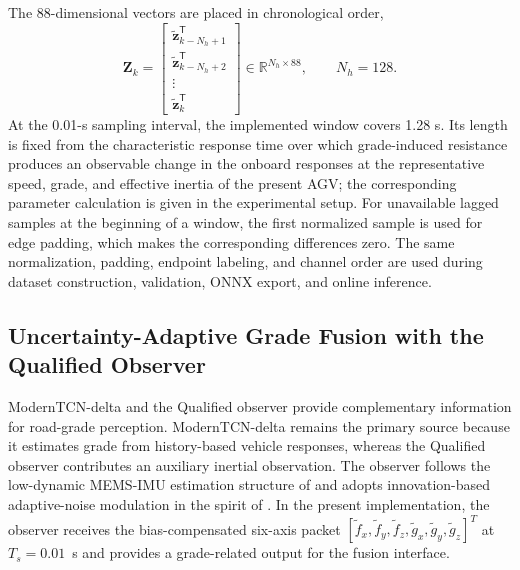 \documentclass{ieeeaccess}
\newcommand{\citep}[1]{\cite{#1}}
\begin{document}
The 88-dimensional vectors are placed in chronological order,
\begin{equation}
\mathbf Z_k=
\begin{bmatrix}
\widetilde{\mathbf z}_{k-N_h+1}^{\mathsf T}\\
\widetilde{\mathbf z}_{k-N_h+2}^{\mathsf T}\\
\vdots\\
\widetilde{\mathbf z}_{k}^{\mathsf T}
\end{bmatrix}
\in\mathbb R^{N_h\times88},\qquad N_h=128.
\label{eq:historical_input_128x88}
\end{equation}
At the 0.01-s sampling interval, the implemented window covers 1.28 s. Its length is fixed from the characteristic response time over which grade-induced resistance produces an observable change in the onboard responses at the representative speed, grade, and effective inertia of the present AGV; the corresponding parameter calculation is given in the experimental setup. For unavailable lagged samples at the beginning of a window, the first normalized sample is used for edge padding, which makes the corresponding differences zero. The same normalization, padding, endpoint labeling, and channel order are used during dataset construction, validation, ONNX export, and online inference.

\subsection{Uncertainty-Adaptive Grade Fusion with the Qualified Observer}
\label{sec:adaptive_slope_fusion}

ModernTCN-delta and the Qualified observer provide complementary information
for road-grade perception. ModernTCN-delta remains the primary source because
it estimates grade from history-based vehicle responses, whereas the Qualified
observer contributes an auxiliary inertial observation. The observer follows
the low-dynamic MEMS-IMU estimation structure of
\citep{Chen2024RobustAttitude} and adopts innovation-based adaptive-noise
modulation in the spirit of \citep{Guo2022SageHusaAKF}. In the present
implementation, the observer receives the bias-compensated six-axis packet
$[\tilde f_x,\tilde f_y,\tilde f_z,\tilde g_x,\tilde g_y,\tilde g_z]^{T}$ at
$T_s=0.01$~s and provides a grade-related output for the fusion interface.
\end{document}

